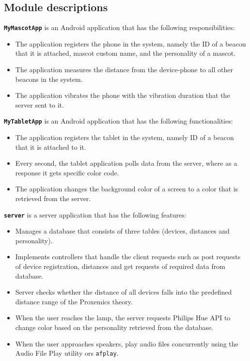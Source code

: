 \subsection{Module descriptions}
\label{subsec:module-descriptions}
\textbf{\texttt{MyMascotApp}} is an Android application that has the following responsibilities:
\begin{itemize}
    \item The application registers the phone in the system, namely the ID of a beacon that it is attached,
    mascot custom name, and the personality of a mascot.
    \item The application measures the distance from the device-phone to all other beacons in the system.
    \item The application vibrates the phone with the vibration duration that the server sent to it.
\end{itemize}

\textbf{\texttt{MyTabletApp}} is an Android application that has the following functionalities:
\begin{itemize}
    \item The application registers the tablet in the system, namely ID of a beacon that it is attached to it.
    \item Every second, the tablet application polls data from the server, where as a response it gets specific color code.
    \item The application changes the background color of a screen to a color that is retrieved from the server.
\end{itemize}

\textbf{\texttt{server}} is a server application that has the following features:
\begin{itemize}
    \item Manages a database that consists of three tables (devices, distances and personality).
    \item Implements controllers that handle the client requests such as post requests of device registration,
    distances and get requests of required data from database.
    \item Server checks whether the distance of all devices falls into the predefined distance range of the Proxemics theory.
    \item When the user reaches the lamp, the server requests Philips Hue API to change color based on the personality retrieved from the database.
    \item When the user approaches speakers, play audio files concurrently using the Audio File Play
    utility ors \texttt{afplay}.
\end{itemize}

